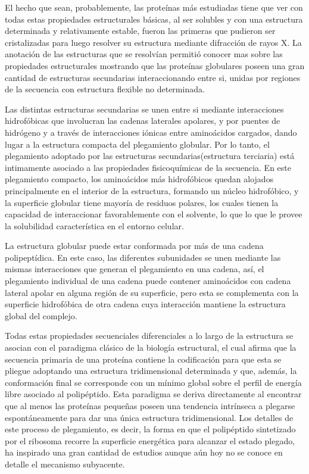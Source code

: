 El hecho que sean, probablemente, las proteínas más estudiadas tiene que ver con todas estas propiedades estructurales básicas, 
al ser solubles y con una estructura determinada y relativamente estable, fueron las primeras que pudieron ser cristalizadas para luego resolver su estructura mediante difracción de rayos X.
La anotación de las estructuras que se resolvían permitió conocer mas sobre las propiedades estructurales mostrando que las proteínas globulares poseen una gran cantidad de estructuras secundarias interaccionando entre si, 
unidas por regiones de la secuencia con estructura flexible no determinada.

Las distintas estructuras secundarias se unen entre si mediante interacciones hidrofóbicas que involucran las cadenas laterales apolares, y por puentes de hidrógeno y a través de interacciones iónicas entre aminoácidos cargados, dando lugar
a la estructura compacta del plegamiento globular. Por lo tanto, el plegamiento adoptado por las estructuras secundarias(estructura terciaria) está intimamente asociado a las propiedades fisicoquímicas de la secuencia. 
En este plegamiento compacto, los aminoácidos más hidrofóbicos quedan alojados principalmente en el interior de la estructura, formando un núcleo hidrofóbico, 
y la superficie globular tiene mayoría de residuos polares, los cuales tienen la capacidad de interaccionar favorablemente con el solvente, lo que lo que le provee la solubilidad característica en el entorno celular. 

La estructura globular puede estar conformada por más de una cadena polipeptídica. En este caso, las diferentes subunidades se unen mediante las mismas interacciones que generan el plegamiento en una cadena, así, 
el plegamiento individual de una cadena puede contener aminoácidos con cadena lateral apolar en alguna región de su superficie, pero esta se complementa con la superficie hidrofóbica de otra cadena cuya interacción mantiene la estructura 
global del complejo.



Todas estas propiedades secuenciales diferenciales a lo largo de la estructura se asocian con el paradigma clásico de la biología estructural, el cual afirma que la secuencia primaria de una proteína 
contiene la codificación para que esta se pliegue adoptando una estructura tridimensional determinada y que, además, la conformación final se corresponde con un mínimo global sobre el perfil de energía libre asociado al polipéptido.  
Esta paradigma se deriva directamente al encontrar que al menos las proteínas pequeñas poseen una tendencia intrínseca a plegarse espontáneamente para dar una única estructura tridimensional.
Los detalles de este proceso de plegamiento, es decir, la forma en que el polipéptido sintetizado por el ribosoma recorre la superficie energética para alcanzar el estado plegado, ha inspirado una gran cantidad de estudios 
aunque aún hoy no se conoce en detalle el mecanismo subyacente.

